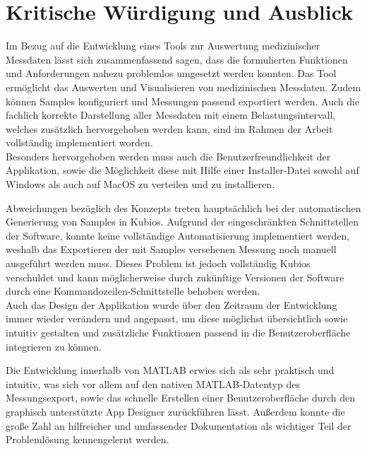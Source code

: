 
\chapter{Kritische Würdigung und Ausblick}
Im Bezug auf die Entwicklung eines Tools zur Auswertung medizinischer Messdaten lässt sich zusammenfassend sagen, dass die formulierten Funktionen und Anforderungen nahezu problemlos umgesetzt werden konnten. Das Tool ermöglicht das Auswerten und Visualisieren von medizinischen Messdaten. Zudem können Samples konfiguriert und Messungen passend exportiert werden. Auch die fachlich korrekte Darstellung aller Messdaten mit einem Belastungsintervall, welches zusätzlich hervorgehoben werden kann, sind im Rahmen der Arbeit vollständig implementiert worden.\\
Besonders hervorgehoben werden muss auch die Benutzerfreundlichkeit der Applikation, sowie die Möglichkeit diese mit Hilfe einer Installer-Datei sowohl auf Windows als auch auf MacOS zu verteilen und zu installieren.

Abweichungen bezüglich des Konzepts treten hauptsächlich bei der automatischen Generierung von Samples in Kubios. Aufgrund der eingeschränkten Schnittstellen der Software, konnte keine vollständige Automatisierung implementiert werden, weshalb das Exportieren der mit Samples versehenen Messung noch manuell ausgeführt werden muss. Dieses Problem ist jedoch vollständig Kubios verschuldet und kann möglicherweise durch zukünftige Versionen der Software durch eine Kommandozeilen-Schnittstelle behoben werden.\\
Auch das Design der Applikation wurde über den Zeitraum der Entwicklung immer wieder verändern und angepasst, um diese möglichst übersichtlich sowie intuitiv gestalten und zusätzliche Funktionen passend in die Benutzeroberfläche integrieren zu können.

Die Entwicklung innerhalb von MATLAB erwies sich als sehr praktisch und intuitiv, was sich vor allem auf den nativen MATLAB-Datentyp des Messungsexport, sowie das schnelle Erstellen einer Benutzeroberfläche durch den graphisch unterstützte App Designer zurückführen lässt. Außerdem konnte die große Zahl an hilfreicher und umfassender Dokumentation als wichtiger Teil der Problemlösung kennengelernt werden.


